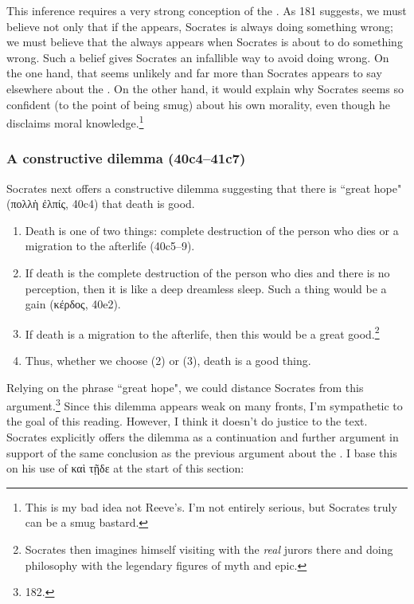 \documentclass[11pt]{article}
\begin{document}
This inference requires a very strong conception of the .
As \citet{reeve1989} 181 suggests, we must believe not only that if the
 appears, Socrates is always doing something wrong; we must
believe that the  always appears when Socrates is about to
do something wrong.  Such a belief gives Socrates an infallible way to avoid
doing wrong.  On the one hand, that seems unlikely and far more than Socrates appears to say elsewhere about the .  On the other hand, it would explain why Socrates seems so confident (to the point of being smug) about his own morality, even though he disclaims moral knowledge.\footnote{This is my bad idea not Reeve's.  I'm not entirely serious, but Socrates truly can be a smug bastard.}

\subsubsection{A constructive dilemma (40c4--41c7)}

Socrates next offers a constructive dilemma suggesting that there is ``great hope" (πολλὴ ἐλπίς, 40c4) that death is good.

\begin{enumerate}
    \item Death is one of two things: complete destruction of the person who dies or a migration to the afterlife (40c5--9).
    \item If death is the complete destruction of the person who dies and there is no perception, then it is like a deep dreamless sleep.  Such a thing would be a gain (κέρδος, 40e2).
    \item If death is a migration to the afterlife, then this would be a great good.\footnote{Socrates then imagines himself visiting with the \emph{real} jurors there and doing philosophy with the legendary figures of myth and epic.}
    \item Thus, whether we choose (2) or (3), death is a good thing.
\end{enumerate}

Relying on the phrase ``great hope", we could distance Socrates from this argument.\footnote{\citet{reeve1989} 182.}  Since this dilemma appears weak on many fronts, I'm sympathetic to the goal of this reading.  However, I think it doesn't do justice to the text.  Socrates explicitly offers the dilemma as a continuation and further argument in support of the same conclusion as the previous argument about the .  I base this on his use of καὶ τῇδε at the start of this section:
\end{document}
